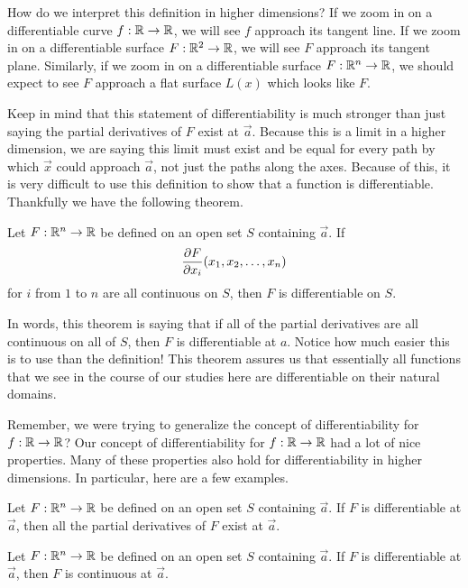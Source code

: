\documentclass{ximera}
\begin{document}
How do we interpret this definition in higher dimensions?  If we zoom
in on a differentiable curve $f:\R \to \R$, we will see $f$ approach
its tangent line. If we zoom in on a differentiable surface $F:\R^2
\to \R$, we will see $F$ approach its tangent plane.  Similarly, if we
zoom in on a differentiable surface $F:\R^n \to \R$, we should expect
to see $F$ approach a flat surface $L(x)$ which looks like $F$.

Keep in mind that this statement of differentiability is much stronger
than just saying the partial derivatives of $F$ exist at $\vec{a}$.
Because this is a limit in a higher dimension, we are saying this
limit must exist and be equal for every path by which $\vec{x}$ could
approach $\vec{a}$, not just the paths along the axes.  Because of
this, it is very difficult to use this definition to show that a
function is differentiable.  Thankfully we have the following theorem.

\begin{theorem}
  Let $F:\R^n\to\R$ be defined on an open set $S$ containing
  $\vec{a}$.  If
  \[
  \pp[F]{x_i}(x_1, x_2, \dots, x_n)
  \]
 for $i$ from $1$ to $n$ are all continuous on $S$, then $F$ is differentiable on $S$.
\end{theorem}

In words, this theorem is saying that if all of the partial derivatives are all continuous on all of $S$, then $F$ is differentiable at $a$.  Notice how much easier this is to use than the definition! This theorem assures us that essentially all functions that we see in
the course of our studies here are differentiable on their natural domains.

Remember, we were trying to generalize the concept of differentiability for $f:\R \to \R$?  Our concept of differentiability for $f:\R \to \R$ had a lot of nice properties.  Many of these properties also hold for differentiability in higher dimensions.  In particular, here are a few examples.

\begin{theorem}
Let $F:\R^n\to\R$ be defined on an open set $S$ containing
$\vec{a}$.  If $F$ is differentiable at $\vec{a}$, then all the partial derivatives of $F$ exist at $\vec{a}$.
\end{theorem}

\begin{theorem}
Let $F:\R^n\to\R$ be defined on an open set $S$ containing
$\vec{a}$.  If $F$ is differentiable at $\vec{a}$, then $F$ is
continuous at $\vec{a}$.
\end{theorem}
\end{document}
